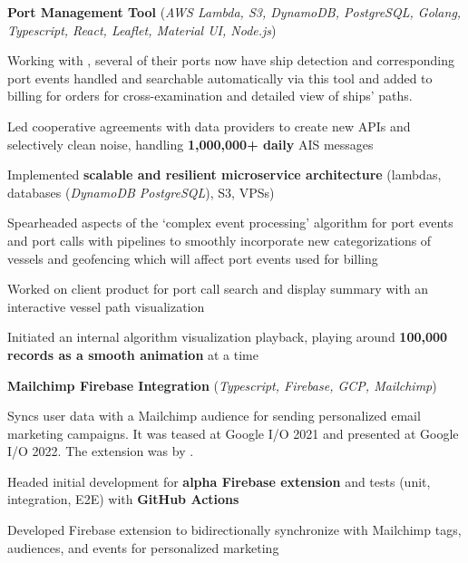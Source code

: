 \begin{cventries}
  \cvcustombodydescription
      {\textbf{Port Management Tool} (\emph{AWS Lambda, S3, DynamoDB, PostgreSQL, Golang, Typescript, React, Leaflet, Material UI, Node.js})}
      {
      \begin{cvtightprose} %
        {Working with , several of their ports now have ship detection and corresponding port events handled and searchable automatically via this tool and added to billing for  orders for cross-examination and detailed view of ships' paths.}
      \end{cvtightprose}
      }
      {
      \begin{cvitems} %
        \item {Led cooperative agreements with data providers to create new APIs and selectively clean noise, handling \textbf{1,000,000+ daily} AIS messages}
        \item {Implemented \textbf{scalable and resilient microservice architecture} (lambdas, databases (\emph{DynamoDB \rightarrow PostgreSQL}), S3, VPSs)}
        \item {Spearheaded aspects of the `complex event processing' algorithm for port events and port calls with pipelines to smoothly incorporate new categorizations of vessels and geofencing which will affect port events used for billing}
        \item {Worked on client product for port call search and display summary with an interactive vessel path visualization}
        \item {Initiated an internal algorithm visualization playback, playing around \textbf{100,000 records as a smooth animation} at a time}
      \end{cvitems}
    }

  \cvcustombodydescription
      {\textbf{Mailchimp Firebase Integration} (\emph{Typescript, Firebase, GCP, Mailchimp})}
      {
      \begin{cvtightprose} %
        {Syncs user data with a Mailchimp audience for sending personalized email marketing campaigns. It was teased at Google I/O 2021 and presented at Google I/O 2022. The extension was  by .}
      \end{cvtightprose}
      }
      {
      \begin{cvitems} %
        \item {Headed initial development for \textbf{alpha Firebase extension} and tests (unit, integration, E2E) with \textbf{GitHub Actions}}
        \item {Developed Firebase extension to bidirectionally synchronize with Mailchimp tags, audiences, and events for personalized marketing}
      \end{cvitems}
    }


\end{cventries}
